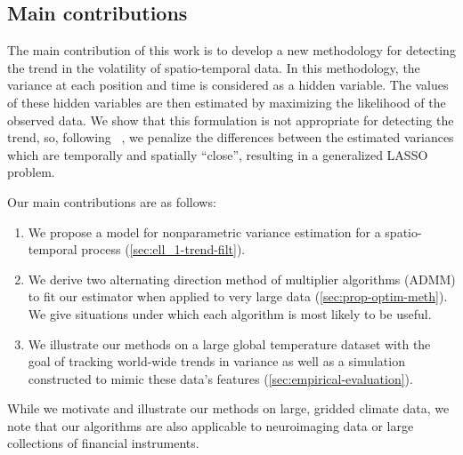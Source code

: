 \documentclass{article}
\begin{document}
\subsection{Main contributions}

The main contribution of this work is to develop a new methodology for
detecting the trend in the volatility of spatio-temporal data. In this
methodology, the variance at each position and time is considered as
a hidden variable. The values of these hidden variables
are then estimated by maximizing the likelihood of the observed
data. We show that this formulation is not appropriate for
detecting the trend, so, following ~\citep{Tibshirani2014}, we penalize the
differences between the estimated variances which
are temporally and spatially ``close'', resulting
in a generalized LASSO problem. %

Our main contributions are as follows:
\begin{enumerate}
\item We propose a model for nonparametric variance estimation for a
  spatio-temporal process (\autoref{sec:ell_1-trend-filt}).
\item We derive two alternating direction method of multiplier
  algorithms (ADMM) to fit our estimator when applied to 
  very large data (\autoref{sec:prop-optim-meth}). We give situations
  under which each algorithm is most likely to be useful.
\item We illustrate our methods on a large global temperature dataset
  with the goal of tracking world-wide trends in variance as well as a
  simulation constructed to mimic these data's features
  (\autoref{sec:empirical-evaluation}). 
\end{enumerate}

While we motivate and illustrate our methods on large, gridded climate
data, we note that our algorithms are also applicable to neuroimaging
data or large collections of financial instruments.
\end{document}

